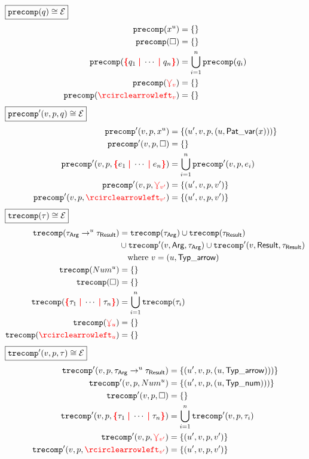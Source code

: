 %
$\boxed{\operatorname{\texttt{precomp}}\mathopen{}\left(q\right)\mathclose{} \cong \mathcal{E}}$
%
\begin{align*}
  \precomp{\varPat{x}{u}} &= \SetOf{}
  \\
  \precomp{\hole} &= \SetOf{}
  \\
  \precomp{\conflictHole{q_1, \cdots, q_n}}
  &= \bigcup_{i=1}^n \precomp{q_i}
  \\
  \precomp{\multiVertex{v}} &= \SetOf{}
  \\
  \precomp{\cycleVertex{v}} &= \SetOf{}
\end{align*}
%
$\boxed{\operatorname{\operatorname{\texttt{precomp}}^\prime}\mathopen{}\left(v, p, q\right)\mathclose{} \cong \mathcal{E}}$
%
\begin{align*}
  \precompPrime{v}{p}{\varPat{x}{u}}
  &= \SetOf{(u', v, p, (u, \PatVar(x)))}
  \\
  \precompPrime{v}{p}{\hole} &= \SetOf{}
  \\
  \precompPrime{v}{p}{\conflictHole{e_1, \cdots, e_n}}
  &= \bigcup_{i=1}^n \precompPrime{v}{p}{e_i}
  \\
  \precompPrime{v}{p}{\multiVertex{v'}}
  &= \SetOf{(u', v, p, v')}
  \\
  \precompPrime{v}{p}{\cycleVertex{v'}}
  &= \SetOf{(u', v, p, v')}
\end{align*}
%
$\boxed{\operatorname{\texttt{trecomp}}\mathopen{}\left(\tau\right)\mathclose{} \cong \mathcal{E}}$
%
\begin{align*}
  \trecomp{\arrowTyp{\tau_\ArrowArg}{u}{\tau_\ArrowResult}}
  &= \trecomp{\tau_\ArrowArg}
  \cup \trecomp{\tau_\ArrowResult} \\
  &\cup \trecompPrime{v}{\ArrowArg}{\tau_\ArrowArg}
  \cup \trecompPrime{v}{\ArrowResult}{\tau_\ArrowResult} \\
  &\quad\text{where } v = (u, \TypArrow)
  \\
  \trecomp{\numTyp{u}} &= \SetOf{}
  \\
  \trecomp{\hole} &= \SetOf{}
  \\
  \trecomp{\conflictHole{\tau_1, \cdots, \tau_n}}
  &= \bigcup_{i=1}^n \trecomp{\tau_i}
  \\
  \trecomp{\multiVertex{u}} &= \SetOf{}
  \\
  \trecomp{\cycleVertex{u}} &= \SetOf{}
\end{align*}
%
$\boxed{\operatorname{\operatorname{\texttt{trecomp}}^\prime}\mathopen{}\left(v, p, \tau\right)\mathclose{} \cong \mathcal{E}}$
%
\begin{align*}
  \trecompPrime{v}{p}{\arrowTyp{\tau_\ArrowArg}{u}{\tau_\ArrowResult}}
  &= \SetOf{(u', v, p, (u, \TypArrow)))}
  \\
  \trecompPrime{v}{p}{\numTyp{u}}
  &= \SetOf{(u', v, p, (u, \TypNum)))}
  \\
  \trecompPrime{v}{p}{\hole} &= \SetOf{}
  \\
  \trecompPrime{v}{p}{\conflictHole{\tau_1, \cdots, \tau_n}}
  &= \bigcup_{i=1}^n \trecompPrime{v}{p}{\tau_i}
  \\
  \trecompPrime{v}{p}{\multiVertex{v'}}
  &= \SetOf{(u', v, p, v')}
  \\
  \trecompPrime{v}{p}{\cycleVertex{v'}}
  &= \SetOf{(u', v, p, v')}
\end{align*}

